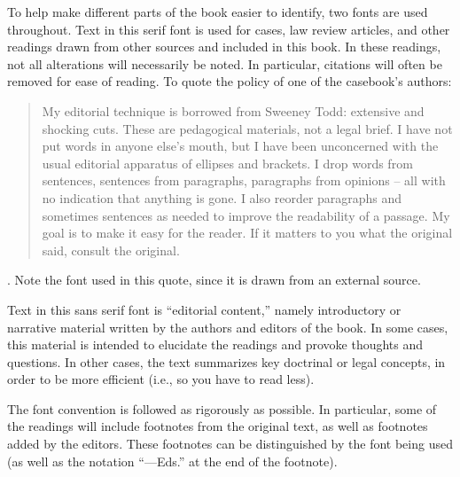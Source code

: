 

To help make different parts of the book easier to identify, two fonts are used
throughout. {\readingfont Text in this serif font} is used for cases, law review
articles, and other readings drawn from other sources and included in this book.
In these readings, not all alterations will necessarily be noted. In particular,
citations will often be removed for ease of reading. To quote the policy of one
of the casebook's authors:
\begin{quote}
My editorial technique is borrowed from Sweeney Todd: extensive and shocking
cuts. These are pedagogical materials, not a legal brief. I have not put words
in anyone else’s mouth, but I have been unconcerned with the usual editorial
apparatus of ellipses and brackets. I drop words from sentences, sentences from
paragraphs, paragraphs from opinions – all with no indication that anything is
gone. I also reorder paragraphs and sometimes sentences as needed to improve the
readability of a passage. My goal is to make it easy for the reader. If it
matters to you what the original said, consult the original.
\end{quote}
. Note the font used in this
quote, since it is drawn from an external source.

{\edfont Text in this sans serif font} is ``editorial content,'' namely
introductory or narrative material written by the authors and editors of the
book. In some cases, this material is intended to elucidate the readings and
provoke thoughts and questions. In other cases, the text summarizes key
doctrinal or legal concepts, in order to be more efficient (i.e., so you have to
read less).

The font convention is followed as rigorously as possible. In particular, some
of the readings will include footnotes from the original text, as well as
footnotes added by the editors. These footnotes can be distinguished by the font
being used (as well as the notation ``---Eds.\@'' at the end of the footnote).


